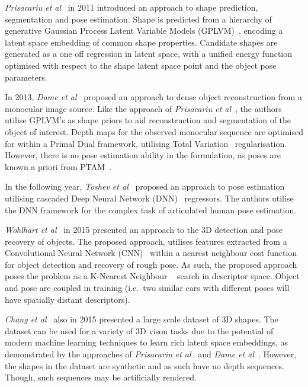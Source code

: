 \textit{Prisacariu et al}~\cite{Prisacariu2011} in 2011 introduced an approach to shape prediction, 
segmentation and pose estimation. Shape is predicted from a hierarchy of generative Gaussian Process 
Latent Variable Models (GPLVM)~\cite{Lawrence2005}, encoding a latent space embedding of common shape 
properties. Candidate shapes are generated as a one off regression in latent space, with a unified 
energy function optimised with respect to the shape latent space point and the object pose parameters.

In 2013, \textit{Dame et al}~\cite{Dame2013} proposed an approach to dense object reconstruction from a 
monocular image source. Like the approach of \textit{Prisacariu et al}~\cite{Prisacariu2011}, the authors 
utilise GPLVM's as shape priors to aid reconstruction and segmentation of the object of interest. Depth maps 
for the observed monocular sequence are optimised for within a Primal Dual framework, utilising 
Total Variation~\cite{Rudin1992} regularisation. However, there is no pose estimation 
ability in the formulation, as poses are known a priori from PTAM~\cite{Klein2007}.

In the following year, \textit{Toshev et al}~\cite{Toshev2014} proposed an approach to pose estimation 
utilising cascaded Deep Neural Network (DNN)~\cite{LeCun2015} regressors. The authors utilise the DNN 
framework for the complex task of articulated human pose estimation. %

\textit{Wohlhart et al}~\cite{Wohlhart2015} in 2015 presented an approach to the 3D detection and pose 
recovery of objects. The proposed approach, utilises features extracted from a Convolutional Neural 
Network (CNN)~\cite{LeCun2015} within a nearest neighbour cost function for object detection and recovery 
of rough pose. As such, the proposed approach poses the problem as a K-Nearest Neighbour
~\cite{Altman1992} search in descriptor space. Object and pose are coupled in training (i.e.\ two similar 
cars with different poses will have spatially distant descriptors).

\textit{Chang et al}~\cite{Chang2015} also in 2015 presented a large scale dataset of 3D shapes. The 
dataset can be used for a variety of 3D vison tasks due to the potential of modern machine learning 
techniques to learn rich latent space embeddings, as demonstrated by the approaches of 
\textit{Prisacariu et al}~\cite{Prisacariu2011} and \textit{Dame et al}~\cite{Dame2013}. However, the 
shapes in the dataset are synthetic and as such have no depth sequences. Though, such sequences may be 
artificially rendered.

